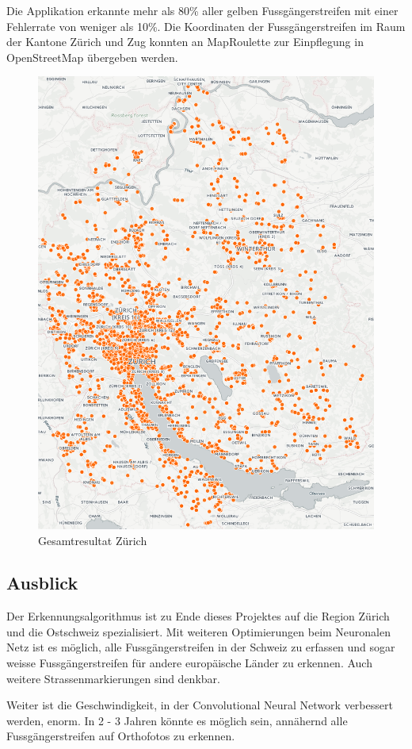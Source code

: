 Die Applikation erkannte mehr als 80\% aller gelben Fussgängerstreifen mit einer Fehlerrate von weniger als 10\%. Die Koordinaten der Fussgängerstreifen im Raum der Kantone Zürich und Zug konnten an MapRoulette zur Einpflegung in OpenStreetMap übergeben werden.
\\
\begin{figure}[H]
	\centering
	\includegraphics[width=\textwidth -80mm]{images/karte.png}
	\caption{Gesamtresultat Zürich}
\end{figure}

\subsection*{Ausblick}
Der Erkennungsalgorithmus ist zu Ende dieses Projektes auf die Region Zürich und die Ostschweiz spezialisiert. Mit weiteren Optimierungen beim Neuronalen Netz ist es möglich, alle Fussgängerstreifen in der Schweiz zu erfassen und sogar weisse Fussgängerstreifen für andere europäische Länder zu erkennen. Auch weitere Strassenmarkierungen sind denkbar.

Weiter ist die Geschwindigkeit, in der Convolutional Neural Network verbessert werden, enorm. In 2 - 3 Jahren könnte es möglich sein, annähernd alle Fussgängerstreifen auf Orthofotos zu erkennen.
\newpage